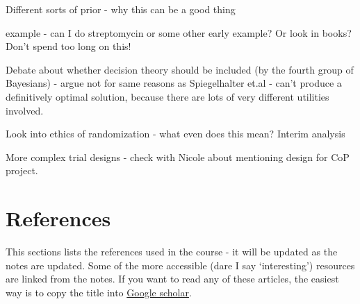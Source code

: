 \documentclass[
  openany]{book}
\theoremstyle{definition}
\theoremstyle{definition}
\theoremstyle{definition}
\theoremstyle{definition}
\theoremstyle{remark}
\begin{document}
Different sorts of prior
- why this can be a good thing

example - can I do streptomycin or some other early example? Or look in books? Don't spend too long on this!

Debate about whether decision theory should be included (by the fourth group of Bayesians) - argue not for same reasons as Spiegelhalter et.al - can't produce a definitively optimal solution, because there are lots of very different utilities involved.

Look into ethics of randomization - what even does this mean?
Interim analysis

More complex trial designs - check with Nicole about mentioning design for CoP project.

\hypertarget{references}{%
\chapter*{References}\label{references}}

This sections lists the references used in the course - it will be updated as the notes are updated. Some of the more accessible (dare I say `interesting') resources are linked from the notes. If you want to read any of these articles, the easiest way is to copy the title into \href{https://scholar.google.co.uk/}{Google scholar}.

  
\end{document}
